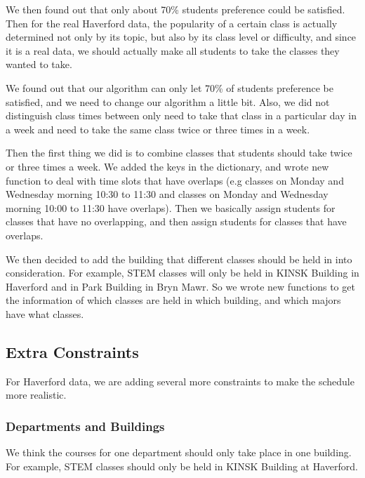 \documentclass[11pt, oneside]{article}   	%
\begin{document}
We then found out that only about 70\% students preference could be satisfied. Then for the real Haverford data, the popularity of a certain class is actually determined not only by its topic, but also by its class level or difficulty, and since it is a real data, we should actually make all students to take the classes they wanted to take. 

We found out that our algorithm can only let 70\% of students preference be satisfied, and we need to change our algorithm a little bit. Also, we did not distinguish class times between only need to take that class in a particular day in a week and need to take the same class twice or three times in a week. 

Then the first thing we did is to combine classes that students should take twice or three times a week. We added the keys in the dictionary, and wrote new function to deal with time slots that have overlaps (e.g classes on Monday and Wednesday morning 10:30 to 11:30 and classes on Monday and Wednesday morning 10:00 to 11:30 have overlaps). Then we basically assign students for classes that have no overlapping, and then assign students for classes that have overlaps. 

We then decided to add the building that different classes should be held in into consideration. For example, STEM classes will only be held in KINSK Building in Haverford and in Park Building in Bryn Mawr. So we wrote new functions to get the information of which classes are held in which building, and which majors have what classes.

\subsection{Extra Constraints}
For Haverford data, we are adding several more constraints to make the schedule more realistic.
\subsubsection{Departments and Buildings}
We think the courses for one department should only take place in one building. 
For example, STEM classes should only be held in KINSK Building at Haverford. 
\end{document}
